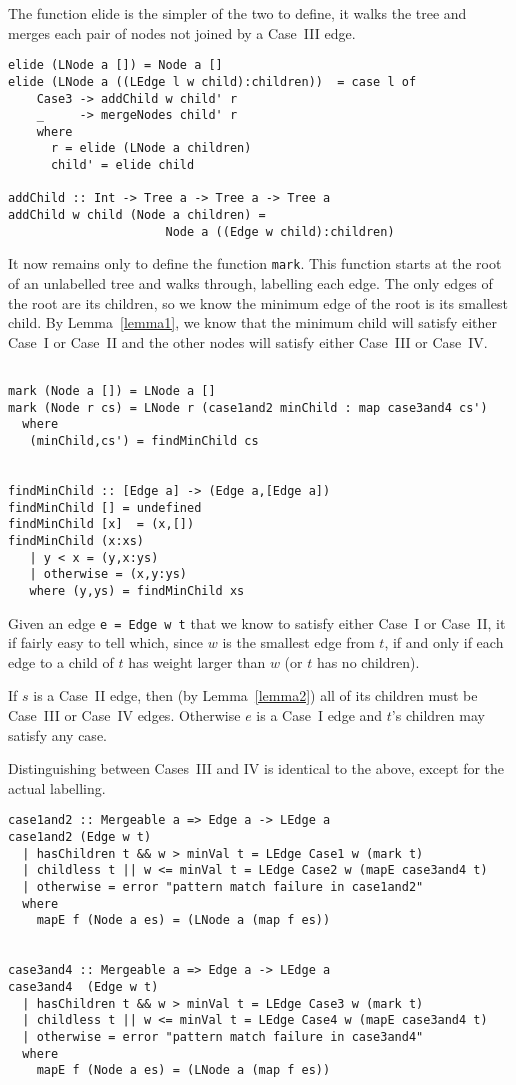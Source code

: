 \documentclass{jfp}
\begin{document}
The function elide is the simpler of the two to define, it walks the
tree and merges each pair of nodes not joined by a Case~III edge.

\begin{verbatim}
elide (LNode a []) = Node a []
elide (LNode a ((LEdge l w child):children))  = case l of
    Case3 -> addChild w child' r
    _     -> mergeNodes child' r
    where
      r = elide (LNode a children)
      child' = elide child

addChild :: Int -> Tree a -> Tree a -> Tree a
addChild w child (Node a children) =
                      Node a ((Edge w child):children)

\end{verbatim}

It now remains only to define the function {\tt mark}. This function
starts at the root of an unlabelled tree and walks through, labelling
each edge. The only edges of the root are its children, so we know the
minimum edge of the root is its smallest child. By Lemma~\ref{lemma1}, we know
that the minimum child will satisfy either Case~I or Case~II and the
other nodes will satisfy either Case~III or Case~IV.

\begin{verbatim}

mark (Node a []) = LNode a []
mark (Node r cs) = LNode r (case1and2 minChild : map case3and4 cs')
  where
   (minChild,cs') = findMinChild cs


findMinChild :: [Edge a] -> (Edge a,[Edge a])
findMinChild [] = undefined
findMinChild [x]  = (x,[])
findMinChild (x:xs)
   | y < x = (y,x:ys)
   | otherwise = (x,y:ys)
   where (y,ys) = findMinChild xs
\end{verbatim}

Given an edge {\tt e = Edge w t} that we know to satisfy either Case~I or
Case~II, it if fairly easy to tell which, since $w$ is the smallest
edge from $t$, if and only if each edge to a child of $t$ has weight larger
than $w$ (or $t$ has no children).

If $s$ is a Case~II edge, then (by Lemma~\ref{lemma2}) all of its
children must be Case~III or Case~IV edges.  Otherwise $e$ is a Case~I
edge and $t$'s children may satisfy any case.

Distinguishing between Cases~III and IV is identical to the above,
except for the actual labelling.

\begin{verbatim}
case1and2 :: Mergeable a => Edge a -> LEdge a
case1and2 (Edge w t)
  | hasChildren t && w > minVal t = LEdge Case1 w (mark t)
  | childless t || w <= minVal t = LEdge Case2 w (mapE case3and4 t)
  | otherwise = error "pattern match failure in case1and2"
  where
    mapE f (Node a es) = (LNode a (map f es))


case3and4 :: Mergeable a => Edge a -> LEdge a
case3and4  (Edge w t)
  | hasChildren t && w > minVal t = LEdge Case3 w (mark t)
  | childless t || w <= minVal t = LEdge Case4 w (mapE case3and4 t)
  | otherwise = error "pattern match failure in case3and4"
  where
    mapE f (Node a es) = (LNode a (map f es))
\end{verbatim}
\end{document}
